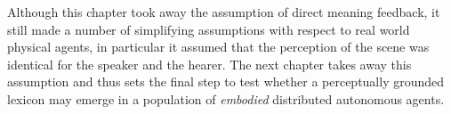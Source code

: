Although this chapter took away the assumption of 
direct meaning feedback, it still made a number of 
simplifying assumptions with respect to real world
physical agents, in particular it assumed that 
the perception of the scene was identical for
the speaker and the hearer. The next chapter takes away 
this assumption and thus sets the final step to test 
whether a perceptually grounded lexicon may 
emerge in a population of {\itshape embodied} distributed 
autonomous agents. 

